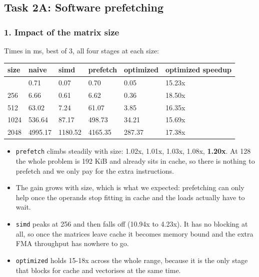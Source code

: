 \documentclass[
  10pt,
]{article}
\newcounter{none} %
\begin{document}
\subsection{Task 2A: Software prefetching}\label{task-2a}

\subsubsection{1. Impact of the matrix size}\label{a-size}

Times in ms, best of 3, all four stages at each size:

{\def\LTcaptype{none} %
\begin{longtable}[]{@{}llllll@{}}
\toprule\noalign{}
size & naive & simd & prefetch & optimized & optimized speedup \\
\midrule\noalign{}
\endhead
\bottomrule\noalign{}
\endlastfoot
128 & 0.71 & 0.07 & 0.70 & 0.05 & 15.23x \\
256 & 6.66 & 0.61 & 6.62 & 0.36 & 18.50x \\
512 & 63.02 & 7.24 & 61.07 & 3.85 & 16.35x \\
1024 & 536.64 & 87.17 & 498.73 & 34.21 & 15.69x \\
2048 & 4995.17 & 1180.52 & 4165.35 & 287.37 & 17.38x \\
\end{longtable}
}

\begin{itemize}
\item
  \texttt{prefetch} climbs steadily with size: 1.02x, 1.01x, 1.03x, 1.08x,
  \textbf{1.20x}. At 128 the whole problem is 192 KiB and already sits in cache,
  so there is nothing to prefetch and we only pay for the extra instructions.

\item
  The gain grows with size, which is what we expected: prefetching can only help
  once the operands stop fitting in cache and the loads actually have to wait.

\item
  \texttt{simd} peaks at 256 and then falls off (10.94x to 4.23x). It has no
  blocking at all, so once the matrices leave cache it becomes memory bound and
  the extra FMA throughput has nowhere to go.

\item
  \texttt{optimized} holds 15-18x across the whole range, because it is the only
  stage that blocks for cache and vectorises at the same time.
\end{itemize}
\end{document}
